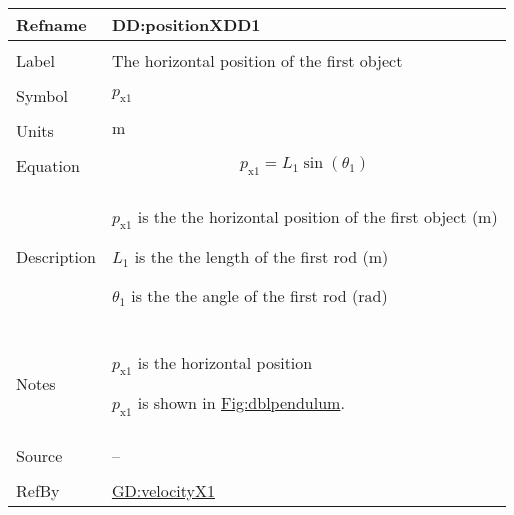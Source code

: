 \documentclass[12pt]{article}
\begin{document}
\vspace{\baselineskip}
\noindent
\begin{minipage}{\textwidth}
\begin{tabular}{>{\raggedright}p{}>{\raggedright\arraybackslash}p{}}
\toprule \textbf{Refname} & \textbf{DD:positionXDD1}
\label{DD:positionXDD1}
\\ \midrule \\
Label & The horizontal position of the first object
        
\\ \midrule \\
Symbol & ${p_{\text{x}1}}$
         
\\ \midrule \\
Units & ${\text{m}}$
        
\\ \midrule \\
Equation & \begin{displaymath}
           {p_{\text{x}1}}={L_{1}} \sin\left({θ_{1}}\right)
           \end{displaymath}
\\ \midrule \\
Description & \begin{symbDescription}
              \item{${p_{\text{x}1}}$ is the the horizontal position of the first object (${\text{m}}$)}
              \item{${L_{1}}$ is the the length of the first rod (${\text{m}}$)}
              \item{${θ_{1}}$ is the the angle of the first rod (${\text{rad}}$)}
              \end{symbDescription}
\\ \midrule \\
Notes & ${p_{\text{x}1}}$ is the horizontal position
        
        ${p_{\text{x}1}}$ is shown in \hyperref[Figure:dblpendulum]{Fig:dblpendulum}.
        
\\ \midrule \\
Source & --
         
\\ \midrule \\
RefBy & \hyperref[GD:velocityX1]{GD:velocityX1}
        
\\ \bottomrule
\end{tabular}
\end{minipage}
\end{document}
